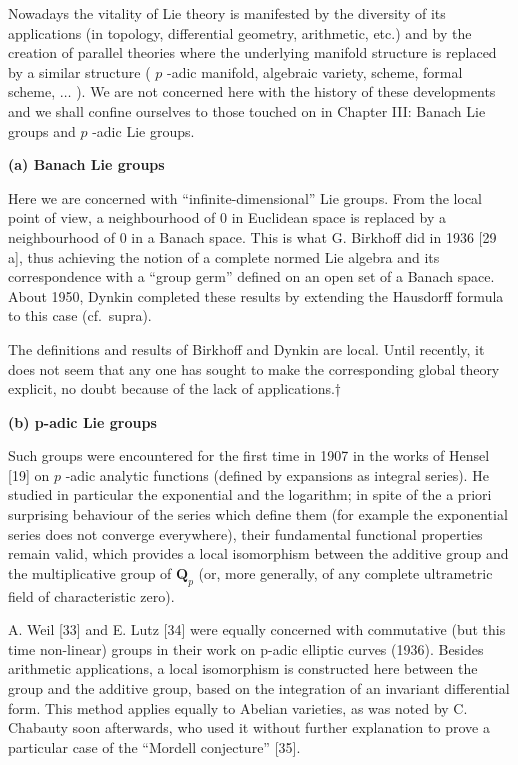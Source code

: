 
Nowadays the vitality of Lie theory is manifested by the diversity of its applications (in topology, differential geometry, arithmetic, etc.) and by the creation of parallel theories where the underlying manifold structure is replaced by a similar structure ( \(p\) -adic manifold, algebraic variety, scheme, formal scheme, \(\ldots\) ). We are not concerned here with the history of these developments and we shall confine ourselves to those touched on in Chapter III: Banach Lie groups and \(p\) -adic Lie groups.

\textbf{(a) Banach Lie groups}

Here we are concerned with ``infinite-dimensional'' Lie groups. From the local point of view, a neighbourhood of 0 in Euclidean space is replaced by a neighbourhood of 0 in a Banach space. This is what G. Birkhoff did in 1936 {[}29 a{]}, thus achieving the notion of a complete normed Lie algebra and its correspondence with a ``group germ'' defined on an open set of a Banach space. About 1950, Dynkin completed these results by extending the Hausdorff formula to this case (cf.~supra).

The definitions and results of Birkhoff and Dynkin are local. Until recently, it does not seem that any one has sought to make the corresponding global theory explicit, no doubt because of the lack of applications.†

\textbf{(b) p-adic Lie groups}

Such groups were encountered for the first time in 1907 in the works of Hensel {[}19{]} on \(p\) -adic analytic functions (defined by expansions as integral series). He studied in particular the exponential and the logarithm; in spite of the a priori surprising behaviour of the series which define them (for example the exponential series does not converge everywhere), their fundamental functional properties remain valid, which provides a local isomorphism between the additive group and the multiplicative group of \(\mathbf{Q}_p\) (or, more generally, of any complete ultrametric field of characteristic zero).

A. Weil {[}33{]} and E. Lutz {[}34{]} were equally concerned with commutative (but this time non-linear) groups in their work on p-adic elliptic curves (1936). Besides arithmetic applications, a local isomorphism is constructed here between the group and the additive group, based on the integration of an invariant differential form. This method applies equally to Abelian varieties, as was noted by C. Chabauty soon afterwards, who used it without further explanation to prove a particular case of the ``Mordell conjecture'' {[}35{]}.


